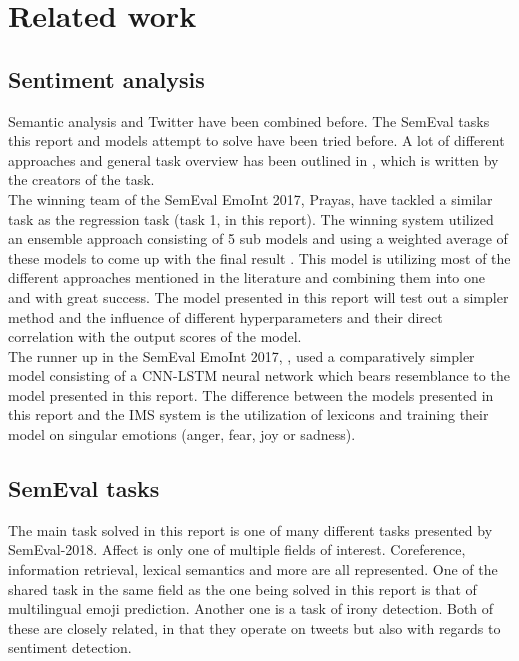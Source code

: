 
\section{Related work}

\subsection{Sentiment analysis}

Semantic analysis and Twitter have been combined before. The SemEval tasks this report and models attempt to solve have been tried before. A lot of different approaches and general task overview has been outlined in \cite{wassa2017}, which is written by the creators of the task.\\
The winning team of the SemEval EmoInt 2017, Prayas, have tackled a similar task as the regression task (task 1, in this report). The winning system utilized an ensemble approach consisting of 5 sub models and using a weighted average of these models to come up with the final result \cite{prayas}. This model is utilizing most of the different approaches mentioned in the literature and combining them into one and with great success. The model presented in this report will test out a simpler method and the influence of different hyperparameters and their direct correlation with the output scores of the model.\\
The runner up in the SemEval EmoInt 2017, \cite{ims}, used a comparatively simpler model consisting of a CNN-LSTM neural network which bears resemblance to the model presented in this report. The difference between the models presented in this report and the IMS system is the utilization of lexicons and training their model on singular emotions (anger, fear, joy or sadness).\\

\subsection{SemEval tasks}
The main task solved in this report is one of many different tasks presented by SemEval-2018. Affect is only one of multiple fields of interest. Coreference, information retrieval, lexical semantics and more are all represented. One of the shared task in the same field as the one being solved in this report is that of multilingual emoji prediction. Another one is a task of irony detection. Both of these are closely related, in that they operate on tweets but also with regards to sentiment detection. 